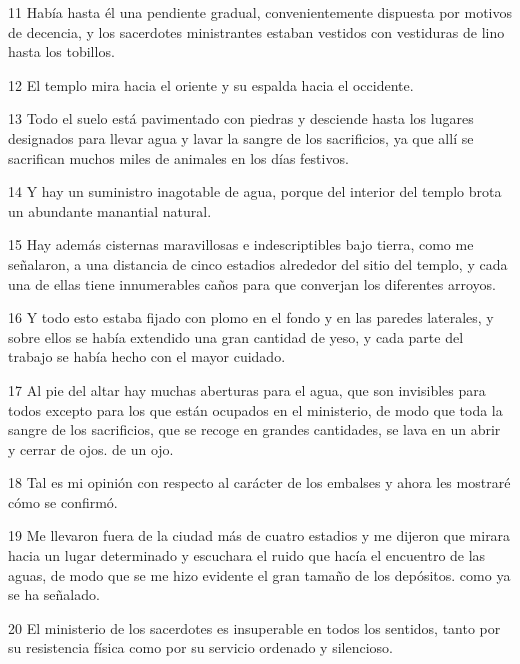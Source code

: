 \par 11 Había hasta él una pendiente gradual, convenientemente dispuesta por motivos de decencia, y los sacerdotes ministrantes estaban vestidos con vestiduras de lino hasta los tobillos.

\par 12 El templo mira hacia el oriente y su espalda hacia el occidente.

\par 13 Todo el suelo está pavimentado con piedras y desciende hasta los lugares designados para llevar agua y lavar la sangre de los sacrificios, ya que allí se sacrifican muchos miles de animales en los días festivos.

\par 14 Y hay un suministro inagotable de agua, porque del interior del templo brota un abundante manantial natural.

\par 15 Hay además cisternas maravillosas e indescriptibles bajo tierra, como me señalaron, a una distancia de cinco estadios alrededor del sitio del templo, y cada una de ellas tiene innumerables caños para que converjan los diferentes arroyos.

\par 16 Y todo esto estaba fijado con plomo en el fondo y en las paredes laterales, y sobre ellos se había extendido una gran cantidad de yeso, y cada parte del trabajo se había hecho con el mayor cuidado.

\par 17 Al pie del altar hay muchas aberturas para el agua, que son invisibles para todos excepto para los que están ocupados en el ministerio, de modo que toda la sangre de los sacrificios, que se recoge en grandes cantidades, se lava en un abrir y cerrar de ojos. de un ojo.

\par 18 Tal es mi opinión con respecto al carácter de los embalses y ahora les mostraré cómo se confirmó.

\par 19 Me llevaron fuera de la ciudad más de cuatro estadios y me dijeron que mirara hacia un lugar determinado y escuchara el ruido que hacía el encuentro de las aguas, de modo que se me hizo evidente el gran tamaño de los depósitos. como ya se ha señalado.

\par 20 El ministerio de los sacerdotes es insuperable en todos los sentidos, tanto por su resistencia física como por su servicio ordenado y silencioso.

